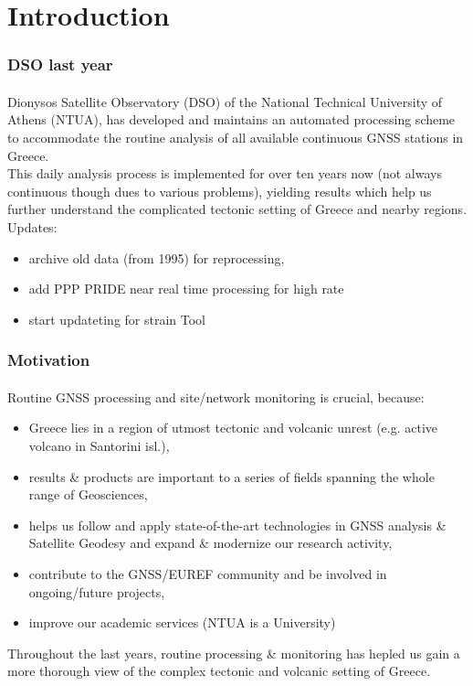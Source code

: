 \graphicspath{{Chapter1/Figs/}}

\section{Introduction}

\begin{frame}\frametitle{DSO last year}\framesubtitle{}\label{}
\vskip-1.5cm
  Dionysos Satellite Observatory (DSO) of the National Technical University of 
  Athens (NTUA), has developed and maintains an automated processing
  scheme to accommodate the routine analysis of all available continuous GNSS 
  stations in Greece.
  \\
  This daily analysis process is implemented for over ten years now (not 
  always continuous though dues to various problems), yielding 
  results which help us further understand the complicated tectonic setting of 
  Greece and nearby regions.
  \\
  Updates:
  \begin{itemize}
    \item archive old data (from 1995) for reprocessing,
    \item add PPP PRIDE near real time processing for high rate
    \item start updateting for strain Tool
  \end{itemize}
\end{frame}
%
\begin{frame}\frametitle{Motivation}\framesubtitle{}
\vskip-1cm
  Routine GNSS processing and site/network monitoring is crucial, because:
  \begin{itemize}
    \item Greece lies in a region of utmost tectonic and volcanic unrest (e.g. 
      active volcano in Santorini isl.),
    \item results \& products are important to a series of fields spanning 
      the whole range of Geosciences,
    \item helps us follow and apply state-of-the-art technologies in GNSS analysis 
      \& Satellite Geodesy and expand \& modernize our research activity,
    \item contribute to the GNSS/EUREF community and be involved in ongoing/future projects,
    \item improve our academic services (NTUA is a University)
  \end{itemize}
  Throughout the last years, routine processing \& monitoring has hepled us gain 
  a more thorough view of the complex tectonic and volcanic setting of Greece.
\end{frame}

